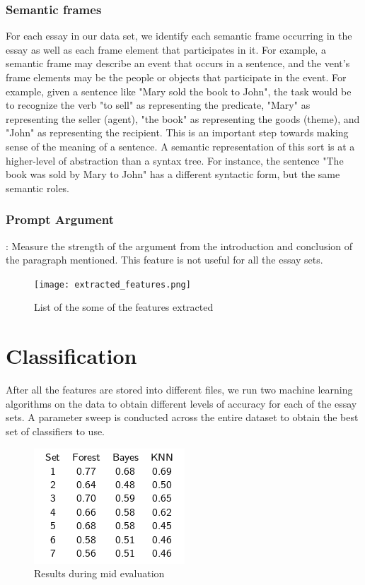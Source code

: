 \documentclass[BTech]{nitkdiss}
\begin{document}
\subsection{Semantic frames}
For each essay in our data set, we identify each semantic frame occurring in the essay as well as each frame element that participates in it. For example, a semantic frame may describe an event that occurs in a sentence, and the vent’s frame elements may be the people or objects that participate in the event. For example, given a sentence like "Mary sold the book to John", the task would be to recognize the verb "to sell" as representing the predicate, "Mary" as representing the seller (agent), "the book" as representing the goods (theme), and "John" as representing the recipient. This is an important step towards making sense of the meaning of a sentence. A semantic representation of this sort is at a higher-level of abstraction than a syntax tree. For instance, the sentence "The book was sold by Mary to John" has a different syntactic form, but the same semantic roles.

\subsection{Prompt Argument}:
Measure the strength of the argument from the introduction and conclusion of the paragraph mentioned. This feature is not useful for all the essay sets.
\begin{figure}[h!]
\centering
\texttt{[image: extracted\_features.png]}
\caption{List of the some of the features extracted}
\label{fig:Essay}
\end{figure}

\chapter{Classification}
After all the features are stored into different files, we run two machine learning algorithms on the data to obtain different levels of accuracy for each of the essay sets. A parameter sweep is conducted across the entire dataset to obtain the best set of classifiers to use.

\begin{figure}[h!]
\centering
\includegraphics[scale=0.90]{snapshot1.png}
\caption{Results during mid evaluation}
\label{fig:Median relaveance}
\end{figure}
\end{document}
